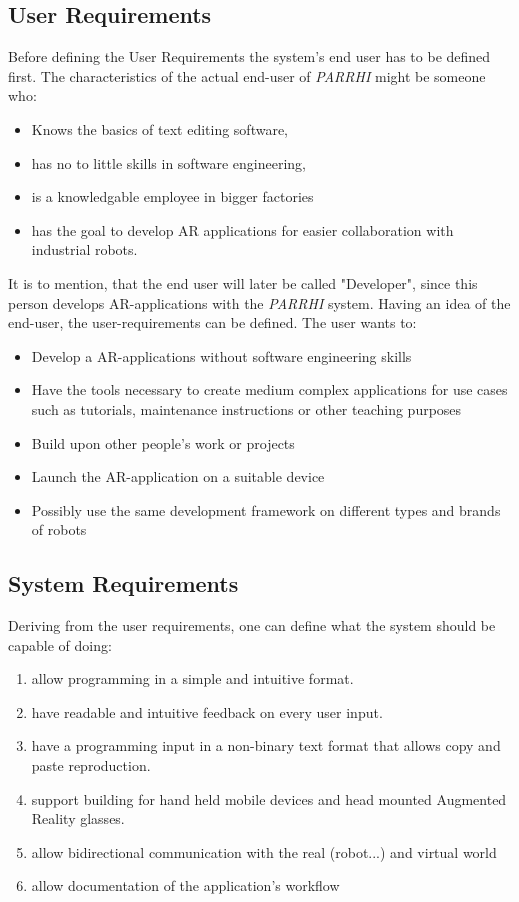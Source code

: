 \subsection{User Requirements}
Before defining the User Requirements the system's end user has to be defined first. The characteristics of the actual end-user of \textit{PARRHI} might be someone who:
\begin{itemize}
	\setlength\itemsep{-1em}
	\item Knows the basics of text editing software,
	\item has no to little skills in software engineering,
	\item is a knowledgable employee in bigger factories
	\item has the goal to develop AR applications for easier collaboration with industrial robots.
\end{itemize}
It is to mention, that the end user will later be called "Developer", since this person develops AR-applications with the \textit{PARRHI} system. Having an idea of the end-user, the user-requirements can be defined. The user wants to:
\begin{itemize}
	\setlength\itemsep{-1em}
	\item Develop a AR-applications without software engineering skills
	\item Have the tools necessary to create medium complex applications for use cases such as tutorials, maintenance instructions or other teaching purposes
	\item Build upon other people's work or projects
	\item Launch the AR-application on a suitable device
	\item Possibly use the same development framework on different types and brands of robots
\end{itemize}

\subsection{System Requirements}\label{Section:SystemRequirements}
Deriving from the user requirements, one can define what the system should be capable of doing:
\begin{enumerate}
	\setlength\itemsep{-1em}
	\item allow programming in a simple and intuitive format.
	\item have readable and intuitive feedback on every user input.
	\item have a programming input in a non-binary text format that allows copy and paste reproduction.
	\item support building for hand held mobile devices and head mounted Augmented Reality glasses.
	\item allow bidirectional communication with the real (robot...) and virtual world
	\item allow documentation of the application's workflow
\end{enumerate}

